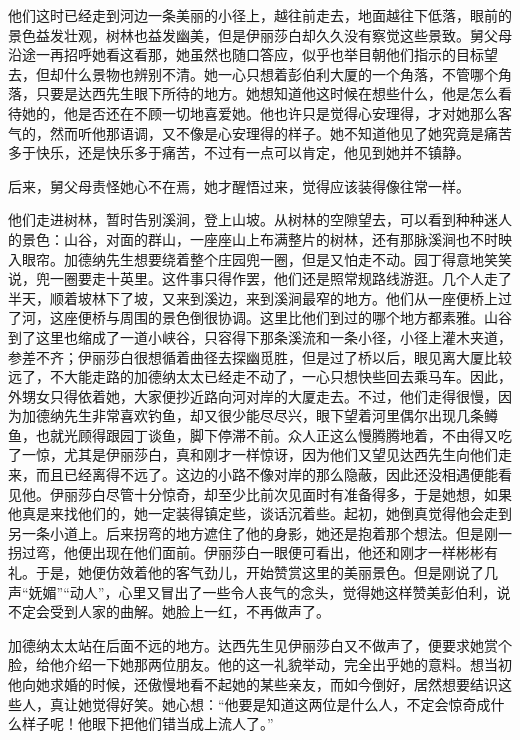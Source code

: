 \par 他们这时已经走到河边一条美丽的小径上，越往前走去，地面越往下低落，眼前的景色益发壮观，树林也益发幽美，但是伊丽莎白却久久没有察觉这些景致。舅父母沿途一再招呼她看这看那，她虽然也随口答应，似乎也举目朝他们指示的目标望去，但却什么景物也辨别不清。她一心只想着彭伯利大厦的一个角落，不管哪个角落，只要是达西先生眼下所待的地方。她想知道他这时候在想些什么，他是怎么看待她的，他是否还在不顾一切地喜爱她。他也许只是觉得心安理得，才对她那么客气的，然而听他那语调，又不像是心安理得的样子。她不知道他见了她究竟是痛苦多于快乐，还是快乐多于痛苦，不过有一点可以肯定，他见到她并不镇静。
\par 后来，舅父母责怪她心不在焉，她才醒悟过来，觉得应该装得像往常一样。
\par 他们走进树林，暂时告别溪涧，登上山坡。从树林的空隙望去，可以看到种种迷人的景色：山谷，对面的群山，一座座山上布满整片的树林，还有那脉溪涧也不时映入眼帘。加德纳先生想要绕着整个庄园兜一圈，但是又怕走不动。园丁得意地笑笑说，兜一圈要走十英里。这件事只得作罢，他们还是照常规路线游逛。几个人走了半天，顺着坡林下了坡，又来到溪边，来到溪涧最窄的地方。他们从一座便桥上过了河，这座便桥与周围的景色倒很协调。这里比他们到过的哪个地方都素雅。山谷到了这里也缩成了一道小峡谷，只容得下那条溪流和一条小径，小径上灌木夹道，参差不齐；伊丽莎白很想循着曲径去探幽觅胜，但是过了桥以后，眼见离大厦比较远了，不大能走路的加德纳太太已经走不动了，一心只想快些回去乘马车。因此，外甥女只得依着她，大家便抄近路向河对岸的大厦走去。不过，他们走得很慢，因为加德纳先生非常喜欢钓鱼，却又很少能尽尽兴，眼下望着河里偶尔出现几条鳟鱼，也就光顾得跟园丁谈鱼，脚下停滞不前。众人正这么慢腾腾地着，不由得又吃了一惊，尤其是伊丽莎白，真和刚才一样惊讶，因为他们又望见达西先生向他们走来，而且已经离得不远了。这边的小路不像对岸的那么隐蔽，因此还没相遇便能看见他。伊丽莎白尽管十分惊奇，却至少比前次见面时有准备得多，于是她想，如果他真是来找他们的，她一定装得镇定些，谈话沉着些。起初，她倒真觉得他会走到另一条小道上。后来拐弯的地方遮住了他的身影，她还是抱着那个想法。但是刚一拐过弯，他便出现在他们面前。伊丽莎白一眼便可看出，他还和刚才一样彬彬有礼。于是，她便仿效着他的客气劲儿，开始赞赏这里的美丽景色。但是刚说了几声“妩媚”“动人”，心里又冒出了一些令人丧气的念头，觉得她这样赞美彭伯利，说不定会受到人家的曲解。她脸上一红，不再做声了。
\par 加德纳太太站在后面不远的地方。达西先生见伊丽莎白又不做声了，便要求她赏个脸，给他介绍一下她那两位朋友。他的这一礼貌举动，完全出乎她的意料。想当初他向她求婚的时候，还傲慢地看不起她的某些亲友，而如今倒好，居然想要结识这些人，真让她觉得好笑。她心想：“他要是知道这两位是什么人，不定会惊奇成什么样子呢！他眼下把他们错当成上流人了。”
